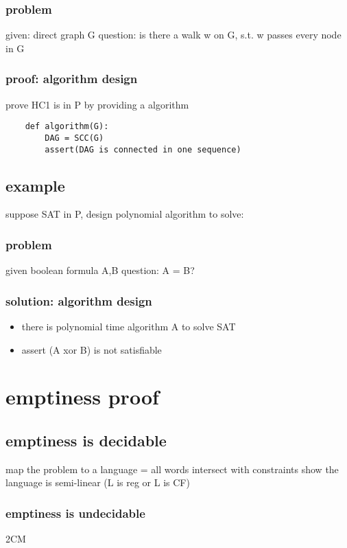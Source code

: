 \documentclass{article}
\begin{document}
\subsubsection{problem}
given: direct graph G
question: is there a walk w on G, s.t. w passes every node in G

\subsubsection{proof: algorithm design}
prove HC1 is in P by providing a algorithm
\begin{lstlisting}
	def algorithm(G):
		DAG = SCC(G)
		assert(DAG is connected in one sequence)
\end{lstlisting}

\subsection{example}
suppose SAT in P, design polynomial algorithm to solve:

\subsubsection{problem}
given boolean formula A,B
question: A = B?

\subsubsection{solution: algorithm design}
\begin{itemize}
	\item there is polynomial time algorithm A to solve SAT
	\item assert (A xor B) is not satisfiable
\end{itemize}

\section{emptiness proof}

\subsection{emptiness is decidable}
map the problem to a language = all words intersect with constraints
show the language is semi-linear (L is reg or L is CF)

\subsubsection{emptiness is undecidable}
2CM
\end{document}

